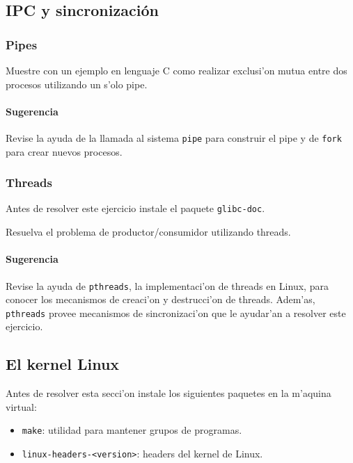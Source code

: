 \subsection{IPC y sincronizaci\'on}

\subsubsection{Pipes}

Muestre con un ejemplo en lenguaje C como realizar exclusi'on mutua entre dos procesos utilizando un s'olo pipe.

\paragraph{Sugerencia}

Revise la ayuda de la llamada al sistema \texttt{pipe} para construir el pipe y de \texttt{fork} para crear
nuevos procesos.


\subsubsection{Threads}

Antes de resolver este ejercicio instale el paquete \texttt{glibc-doc}.

Resuelva el problema de productor/consumidor utilizando threads.

\paragraph{Sugerencia}

Revise la ayuda de \texttt{pthreads}, la implementaci'on de threads en Linux, para conocer los mecanismos de creaci'on y
destrucci'on de threads. Adem'as, \texttt{pthreads} provee mecanismos de sincronizaci'on que le ayudar'an a resolver este
ejercicio.



\subsection{El kernel Linux}

Antes de resolver esta secci'on instale los siguientes paquetes en la m'aquina virtual:

\begin{itemize}
\item \texttt{make}: utilidad para mantener grupos de programas.
\item \texttt{linux-headers-<version>}: headers del kernel de Linux.
\end{itemize}

